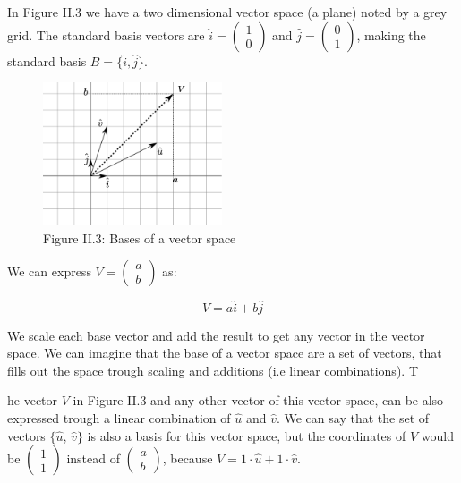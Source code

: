 In Figure II.3 we have a two dimensional vector space (a plane) noted by a grey grid. The standard basis vectors are \(\hat{i} = \begin{pmatrix} 1 \\ 0 \end{pmatrix}\) and \(\hat{j} = \begin{pmatrix} 0 \\ 1 \end{pmatrix}\), making the standard basis \(B = \{\hat{i}, \hat{j}\}\).


\begin{figure}[htbp]
    \begin{center}
        \includegraphics[width=150pt]{../img/ii-span-and-base.png}
        \caption{Figure II.3: Bases of a vector space}
    \end{center}
\end{figure}


We can express \(V = \begin{pmatrix} a \\ b \end{pmatrix}\) as:

\[V = a \hat{i} + b \hat{j}\]

We scale each base vector and add the result to get any vector in the vector space. We can imagine that the base of a vector space are a set of vectors, that fills out the space trough scaling and additions (i.e linear combinations). T

he vector \(V\) in Figure II.3 and any other vector of this vector space, can be also expressed trough a linear combination of \(\hat{u}\) and \(\hat{v}\). We can say that the set of vectors \(\{\hat{u}\), \(\hat{v}\}\) is also a basis for this vector space, but the coordinates of \(V\) would be \(\begin{pmatrix} 1 \\ 1 \end{pmatrix}\) instead of \(\begin{pmatrix} a \\ b \end{pmatrix}\), because \(V = 1 \cdot \hat{u} + 1 \cdot \hat{v}\).


